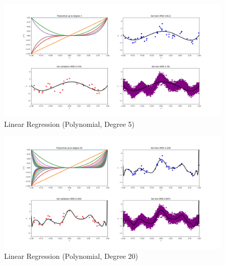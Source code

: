 \documentclass[12pt,halfline,a4paper]{ouparticle}
\begin{document}
	\begin{figure}[H]
	\centering
	        \includegraphics[width=\textwidth]{figures/linreg_degree_5.png}
	    \caption{Linear Regression (Polynomial, Degree 5)}
	\end{figure}
	\begin{figure}[H]
	\centering
	        \includegraphics[width=\textwidth]{figures/linreg_degree_20.png}
	    \caption{Linear Regression (Polynomial, Degree 20)}
	\end{figure}
		
\end{document}
